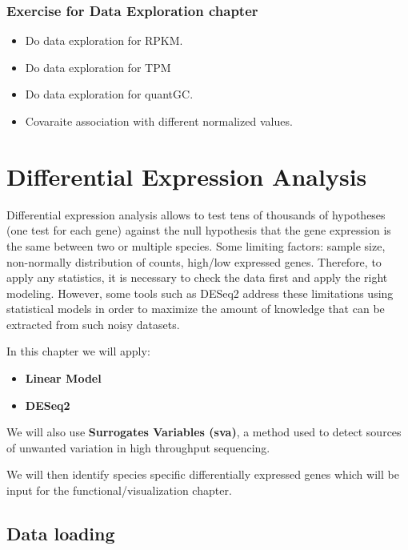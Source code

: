 \documentclass[]{book}
\begin{document}
\hypertarget{exercise-for-data-exploration-chapter}{%
\subsection{Exercise for Data Exploration chapter}\label{exercise-for-data-exploration-chapter}}

\begin{itemize}
\item
  Do data exploration for RPKM.
\item
  Do data exploration for TPM
\item
  Do data exploration for quantGC.
\item
  Covaraite association with different normalized values.
\end{itemize}

\hypertarget{DiffExpAnalysis}{%
\chapter{Differential Expression Analysis}\label{DiffExpAnalysis}}

Differential expression analysis allows to test tens of thousands of hypotheses (one test for each gene) against the null hypothesis that the gene expression is the same between two or multiple species.
Some limiting factors: sample size, non-normally distribution of counts, high/low expressed genes.
Therefore, to apply any statistics, it is necessary to check the data first and apply the right modeling.
However, some tools such as DESeq2 address these limitations using statistical models in order to maximize the amount of knowledge that can be extracted from such noisy datasets.

In this chapter we will apply:

\begin{itemize}
\item
  \textbf{Linear Model}
\item
  \textbf{DESeq2}
\end{itemize}

We will also use \textbf{Surrogates Variables (sva)}, a method used to detect sources of unwanted variation in high throughput sequencing.

We will then identify species specific differentially expressed genes which will be input for the functional/visualization chapter.

\hypertarget{data-loading-1}{%
\section{Data loading}\label{data-loading-1}}
\end{document}
